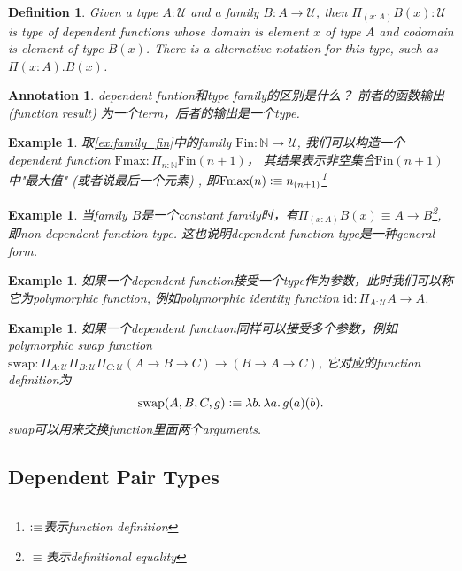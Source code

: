 \documentclass{article}
\newtheorem{example}[theorem]{Example}
\newtheorem{definition}[theorem]{Definition}
\newtheorem{annotation}[theorem]{Annotation}
\newcommand{\lam}[2]{\ensuremath{\lambda #1\ldotp #2}} %
\newcommand{\defeqv}{\vcentcolon\equiv}
\begin{document}
\begin{definition}
\rm Given a type $A:\mathcal{U}$ and a family $B:A \to \mathcal{U}$, then $\Pi_{(x:A)} B(x):\mathcal{U}$ is type of dependent functions whose domain is element $x$ of type $A$ and  codomain is element of type $B(x)$. There is a alternative notation for this type, such as $\Pi(x : A).B(x)$.
\end{definition}

\begin{annotation}
\rm dependent funtion和type family的区别是什么？ 前者的函数输出 (function result) 为一个term，后者的输出是一个type.
\end{annotation}


\begin{example}
\rm 取\ref{ex:family_fin}中的family $\text{Fin}:\mathbb{N} \to \mathcal{U}$, 我们可以构造一个dependent function $\text{Fmax}:\Pi_{n : \mathbb{N}} \text{Fin}(n+1)$， 其结果表示非空集合$\text{Fin}(n+1)$中"最大值" (或者说最后一个元素) , 即$\text{Fmax}(n) \defeqv n_{(n+1)}$\footnote{$\defeqv$表示function definition} 
\end{example}

\begin{example}
\rm 当family $B$是一个constant family时，有$\Pi_{(x:A)} B(x) \equiv A \to B$\footnote{$\equiv$表示definitional equality}, 即non-dependent function type. 这也说明dependent function type是一种general form.
\end{example}

\begin{example}
\rm 如果一个dependent function接受一个type作为参数，此时我们可以称它为polymorphic function, 例如polymorphic identity function $\text{id}:\Pi_{A:\mathcal{U}} A \to A$.
\end{example}

\begin{example}
\rm 如果一个dependent functuon同样可以接受多个参数，例如polymorphic swap function $\text{swap}: \Pi_{A:\mathcal{U}}\Pi_{B:\mathcal{U}}\Pi_{C:\mathcal{U}}(A \to B \to C) \to (B \to A \to C)$, 它对应的function definition为
\[
	\text{swap}(A,B,C,g) \defeqv \lam{b}{\lam{a}{g(a)(b)}}.
\]
swap可以用来交换function里面两个arguments.
\end{example}

\subsection{Dependent Pair Types}
\end{document}
